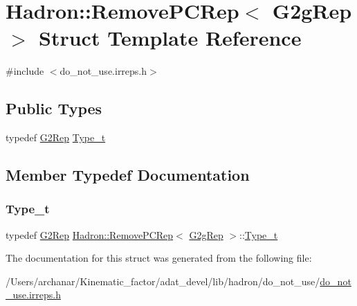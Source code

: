 \hypertarget{structHadron_1_1RemovePCRep_3_01G2gRep_01_4}{}\section{Hadron\+:\+:Remove\+P\+C\+Rep$<$ G2g\+Rep $>$ Struct Template Reference}
\label{structHadron_1_1RemovePCRep_3_01G2gRep_01_4}


{\ttfamily \#include $<$do\+\_\+not\+\_\+use.\+irreps.\+h$>$}

\subsection*{Public Types}
\begin{DoxyCompactItemize}
\item 
typedef \mbox{\hyperlink{structHadron_1_1G2Rep}{G2\+Rep}} \mbox{\hyperlink{structHadron_1_1RemovePCRep_3_01G2gRep_01_4_a941bc08fab6e6b89fb5316cdcc77cd49}{Type\+\_\+t}}
\end{DoxyCompactItemize}


\subsection{Member Typedef Documentation}
\mbox{\label{structHadron_1_1RemovePCRep_3_01G2gRep_01_4_a941bc08fab6e6b89fb5316cdcc77cd49}} 
\subsubsection{\texorpdfstring{Type\_t}{Type\_t}}
{\footnotesize\ttfamily typedef \mbox{\hyperlink{structHadron_1_1G2Rep}{G2\+Rep}} \mbox{\hyperlink{structHadron_1_1RemovePCRep}{Hadron\+::\+Remove\+P\+C\+Rep}}$<$ \mbox{\hyperlink{structHadron_1_1G2gRep}{G2g\+Rep}} $>$\+::\mbox{\hyperlink{structHadron_1_1RemovePCRep_3_01G2gRep_01_4_a941bc08fab6e6b89fb5316cdcc77cd49}{Type\+\_\+t}}}



The documentation for this struct was generated from the following file\+:\begin{DoxyCompactItemize}
\item 
/\+Users/archanar/\+Kinematic\+\_\+factor/adat\+\_\+devel/lib/hadron/do\+\_\+not\+\_\+use/\mbox{\hyperlink{do__not__use_8irreps_8h}{do\+\_\+not\+\_\+use.\+irreps.\+h}}\end{DoxyCompactItemize}
